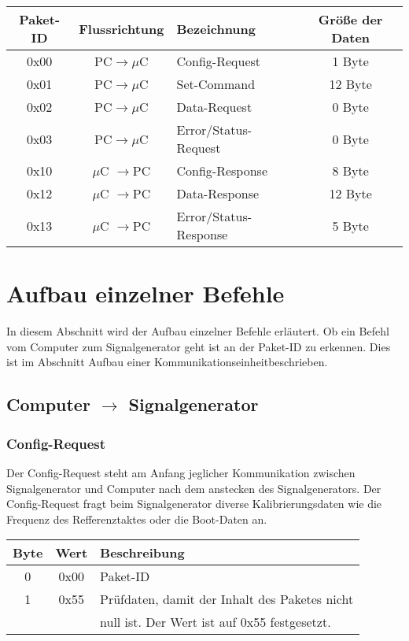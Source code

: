 \documentclass[a4paper,12pt]{article}
\begin{document}
\begin{tabular}{c||c|l|c}
Paket-ID & Flussrichtung & Bezeichnung & Größe der Daten \\ 
\hline 
\hline
0x00 & PC$\rightarrow \mu$C & Config-Request & 1 Byte \\ 
\hline 
0x01 & PC$\rightarrow \mu$C & Set-Command & 12 Byte \\ 
\hline 
0x02 & PC$\rightarrow \mu$C & Data-Request & 0 Byte \\ 
\hline 
0x03 & PC$\rightarrow \mu$C & Error/Status-Request & 0 Byte \\ 
\hline 
0x10 & $\mu$C $\rightarrow$PC & Config-Response & 8 Byte \\  
\hline 
0x12 & $\mu$C $\rightarrow$PC & Data-Response & 12 Byte \\ 
\hline
0x13 & $\mu$C $\rightarrow$PC & Error/Status-Response & 5 Byte \\ 
\end{tabular}

\section{Aufbau einzelner Befehle}
In diesem Abschnitt wird der Aufbau einzelner Befehle erläutert. Ob ein Befehl vom Computer zum Signalgenerator geht ist an der Paket-ID zu erkennen. Dies ist im Abschnitt \glqq Aufbau einer Kommunikationseinheit\grqq beschrieben.

\pagebreak
\subsection{Computer $\rightarrow$ Signalgenerator}

\subsubsection{Config-Request}
Der Config-Request steht am Anfang jeglicher Kommunikation zwischen Signalgenerator und Computer nach dem anstecken des Signalgenerators. Der Config-Request fragt beim Signalgenerator diverse Kalibrierungsdaten wie die Frequenz des Refferenztaktes oder die Boot-Daten an.

\begin{flushleft}
\begin{tabular}{c||c|l}
Byte & Wert & Beschreibung \\
\hline
\hline
0 & 0x00 & Paket-ID \\
\hline
1 & 0x55 & Prüfdaten, damit der Inhalt des Paketes nicht \\
& & null ist. Der Wert ist auf 0x55 festgesetzt.\\
\end{tabular}
\end{flushleft}
\end{document}
